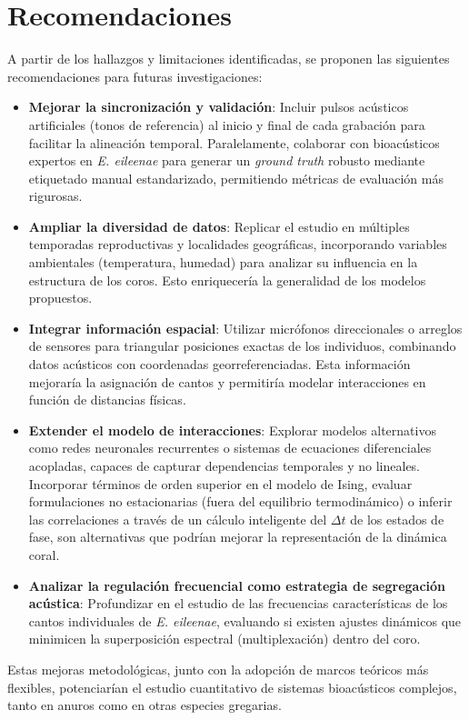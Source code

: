 \chapter*{Recomendaciones}\label{chapter:recomendations}


A partir de los hallazgos y limitaciones identificadas, se 
proponen las siguientes recomendaciones para futuras 
investigaciones:
\begin{itemize}
    \item \textbf{Mejorar la sincronización y validación}: 
    Incluir pulsos acústicos artificiales (tonos de referencia) 
    al inicio y final de cada grabación para facilitar la 
    alineación temporal. Paralelamente, colaborar con 
    bioacústicos expertos en \textit{E. eileenae} para generar 
    un \textit{ground truth} robusto mediante etiquetado manual 
    estandarizado, permitiendo métricas de evaluación más 
    rigurosas.
    
    \item \textbf{Ampliar la diversidad de datos}: Replicar el 
    estudio en múltiples temporadas reproductivas y localidades 
    geográficas, incorporando variables ambientales 
    (temperatura, humedad) para analizar su influencia en la 
    estructura de los coros. Esto enriquecería la generalidad de 
    los modelos propuestos.

    \item \textbf{Integrar información espacial}: Utilizar 
    micrófonos direccionales o arreglos de sensores para 
    triangular posiciones exactas de los individuos, combinando 
    datos acústicos con coordenadas georreferenciadas. Esta 
    información mejoraría la asignación de cantos y permitiría 
    modelar interacciones en función de distancias físicas.

    \item \textbf{Extender el modelo de interacciones}: Explorar modelos 
    alternativos como redes neuronales recurrentes o sistemas de 
    ecuaciones diferenciales acopladas, capaces de capturar 
    dependencias temporales y no lineales. Incorporar términos 
    de orden superior en el modelo de Ising, evaluar 
    formulaciones no estacionarias (fuera del equilibrio termodinámico)
    o inferir las correlaciones a través de un cálculo inteligente 
    del \(\Delta t\) de los estados de fase, son alternativas que
    podrían mejorar la 
    representación de la dinámica coral.

    \item \textbf{Analizar la regulación frecuencial como estrategia de segregación acústica}: 
    Profundizar en el estudio de las frecuencias características 
    de los cantos individuales de \textit{E. eileenae}, 
    evaluando si existen ajustes dinámicos que minimicen la 
    superposición espectral (multiplexación) dentro del coro.
    

\end{itemize}


Estas mejoras metodológicas, junto con la adopción de marcos 
teóricos más flexibles, potenciarían el estudio cuantitativo de 
sistemas bioacústicos complejos, tanto en anuros como en otras 
especies gregarias.